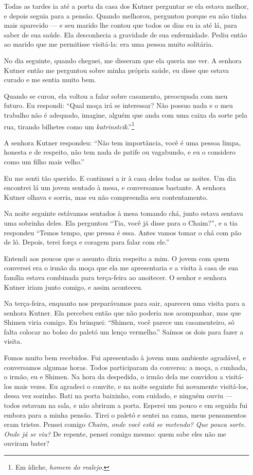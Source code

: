 Todas as tardes ia até a porta da casa dos Kutner perguntar se ela
estava melhor, e depois seguia para a pensão. Quando melhorou, perguntou
porque eu não tinha mais aparecido --- e seu marido lhe contou que todos os
dias eu ia até lá, para saber de sua saúde. Ela desconhecia a 
gravidade de sua enfermidade. Pediu então ao marido que me permitisse visitá-la: era 
uma pessoa muito solitária.

No dia seguinte, quando cheguei, me disseram que 
ela queria me ver. A senhora Kutner então me perguntou sobre
minha própria saúde, eu disse que estava curado e me sentia muito bem.

Quando se curou, ela voltou a falar sobre casamento,
preocupada com meu futuro. Eu respondi: ``Qual moça irá se
interessar? Não possuo nada e o meu trabalho não é adequado, imagine,
alguém que anda com uma caixa da sorte pela rua, tirando bilhetes como
um \textit{katrinstcik}.''\footnote{Em ídiche, \textit{homem do realejo}.}

A senhora Kutner respondeu: ``Não tem importância, você é uma pessoa
limpa, honesta e de respeito, não tem nada de patife ou vagabundo, e eu o
considero como um filho mais velho.''

Eu me senti tão querido. E continuei a ir à casa deles todas as noites.
Um dia encontrei lá um jovem sentado à mesa, e conversamos bastante. A
senhora Kutner olhava e sorria, mas eu não compreendia seu contentamento.

Na noite seguinte estávamos sentados à mesa tomando chá, junto estava
sentava uma sobrinha deles. Ela perguntou ``Tia, você já disse para o
Chaim?'', e a tia respondeu ``Temos tempo, que pressa é essa.
Antes vamos tomar o chá com pão de ló. Depois, terei força e coragem para
falar com ele.''

Entendi aos poucos que o assunto dizia respeito a mim. O jovem com quem conversei
era o irmão da moça que ela me apresentaria e a visita à casa de sua família
estava combinada para terça-feira ao anoitecer. O senhor e senhora Kutner iriam junto
comigo, e assim aconteceu.

Na terça-feira, enquanto nos preparávamos para sair, apareceu uma visita para a
senhora Kutner. Ela percebeu então que não poderia nos acompanhar, mas
que Shimen viria comigo. Eu brinquei: ``Shimen, você
parece um casamenteiro, só falta colocar no bolso do paletó um lenço
vermelho.'' Saímos os dois para fazer a visita.

Fomos muito bem recebidos. Fui apresentado à jovem num ambiente
agradável, e conversamos algumas horas. Todos participaram da conversa: a
moça, a cunhada, o irmão, eu e Shimen. Na hora da despedida, o irmão
dela me convidou a visitá-los mais vezes. Eu agradeci o convite, e na noite 
seguinte fui novamente visitá-los, dessa vez sozinho. Bati
na porta baixinho, com cuidado, e ninguém ouviu --- todos
estavam na sala, e não abriram a porta. Esperei um pouco e em seguida fui embora
para a minha pensão. Tirei o paletó e sentei na cama, meus pensamentos eram tristes. 
Pensei comigo \textit{Chaim, onde você está se
metendo? Que pouca sorte. Onde já se viu?} De repente, pensei comigo mesmo: 
quem sabe eles não me ouviram bater?

